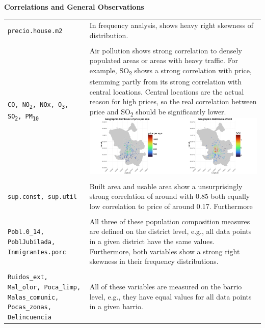 \documentclass[11pt]{report} %
\begin{document}
\textbf{} \\


\textbf{Correlations and General Observations} \\


\begin{longtable}{p{} | p{}}

    \texttt{precio.house.m2} & In frequency analysis, shows heavy right skewness of distribution. \\ \\

    \texttt{CO, NO\textsubscript{2}, NOx, O\textsubscript{3}, SO\textsubscript{2}, PM\textsubscript{10}} & Air pollution shows strong correlation to densely populated areas or areas with heavy traffic. For example, SO\textsubscript{2} shows a strong correlation with price, stemming partly from its strong correlation with central locations. Central locations are the actual reason for high prices, so the real correlation between price and SO\textsubscript{2} should be significantly lower. \newline
    \includegraphics[width=1\linewidth]{Images/price_vs_so2_map.png} \\ \\

    \texttt{sup.const, sup.util} & Built area and usable area show a unsurprisingly strong correlation of around with 0.85 both equally low correlation to price of around 0.17. Furthermore \\ \\


    \texttt{Pobl.0\_14, PoblJubilada, Inmigrantes.porc} & All three of these population composition measures are defined on the district level, e.g., all data points in a given district have the same values. Furthermore, both variables show a strong right skewness in their frequency distributions.\\ \\


    \texttt{Ruidos\_ext, Mal\_olor, Poca\_limp, Malas\_comunic, Pocas\_zonas, Delincuencia} & All of these variables are measured on the barrio level, e.g., they have equal values for all data points in a given barrio. \\
    
\end{longtable}
\end{document}
